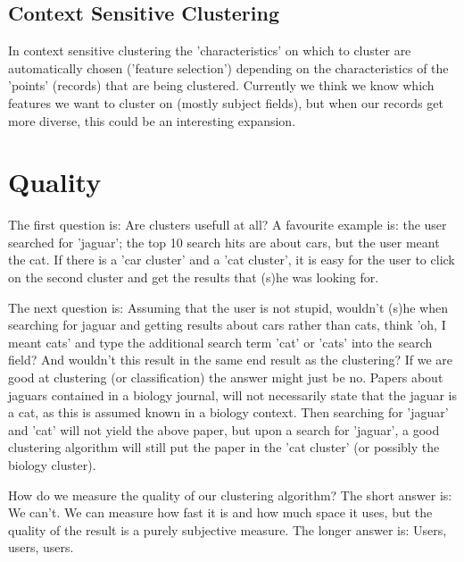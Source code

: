 \documentclass[a4paper,12pt]{article}
\begin{document}
\subsection{Context Sensitive Clustering}

In context sensitive clustering the 'characteristics' on which to
cluster are automatically chosen ('feature selection') depending on
the characteristics of the 'points' (records) that are being
clustered. Currently we think we know which features we want to
cluster on (mostly subject fields), but when our records get more
diverse, this could be an interesting expansion.

\appendix

\section{Quality}

The first question is: Are clusters usefull at all? A favourite
example is: the user searched for 'jaguar'; the top 10 search hits are
about cars, but the user meant the cat. If there is a 'car cluster' and
a 'cat cluster', it is easy for the user to click on the second
cluster and get the results that (s)he was looking for. 

The next question is: Assuming that the user is not stupid, wouldn't
(s)he when searching for jaguar and getting results about cars rather
than cats, think 'oh, I meant cats' and type the additional search
term 'cat' or 'cats' into the search field? And wouldn't this result
in the same end result as the clustering? If we are good at clustering
(or classification) the answer might just be no. Papers about jaguars
contained in a biology journal, will not necessarily state that the
jaguar is a cat, as this is assumed known in a biology context. Then
searching for 'jaguar' and 'cat' will not yield the above paper, but
upon a search for 'jaguar', a good clustering algorithm will still put
the paper in the 'cat cluster' (or possibly the biology cluster).

How do we measure the quality of our clustering algorithm? The short
answer is: We can't. We can measure how fast it is and how much space
it uses, but the quality of the result is a purely subjective
measure. The longer answer is: Users, users, users.
\end{document}
